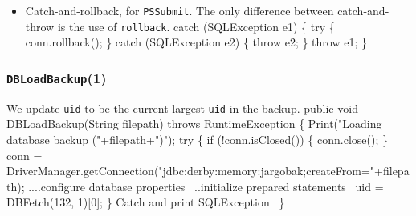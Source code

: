 \documentclass{article}
\def\nwendcode{\endtrivlist \endgroup}
\let\nwdocspar=\par
\theoremstyle{definition}
\begin{document}
\begin{itemize}
\item Catch-and-rollback, for {\tt{}\protect{}PSSubmit}.  The only difference between
catch-and-throw is the use of {\tt{}rollback}.
\nwenddocs{}\endmoddef{}
catch (SQLException e1) \{
  try \{
    conn.rollback();
  \} catch (SQLException e2) \{
    throw e2;
  \}
  throw e1;
\}
\nwendcode{}\nwdocspar
\end{itemize}
\subsubsection{{\tt{}DBLoadBackup}(1)}
\label{sec:load-database-backup}
We update {\tt{}\protect{}uid} to be the current largest {\tt{}\protect{}uid} in the backup.
\nwenddocs{}\endmoddef{}
public void DBLoadBackup(String filepath) throws RuntimeException \{
  Print("Loading database backup ("+filepath+")");
  try \{
    if (!conn.isClosed()) \{
      conn.close();
    \}
    conn = DriverManager.getConnection("jdbc:derby:memory:jargobak;createFrom="+filepath);
    \LA{}....configure database properties~{\nwtagstyle{}}\RA{}
    \LA{}..initialize prepared statements~{\nwtagstyle{}}\RA{}
    uid = DBFetch(132, 1)[0];
  \}
  \LA{}Catch and print \code{}SQLException\edoc{}~{\nwtagstyle{}}\RA{}
\}
\nwendcode{}\nwdocspar
\end{document}
